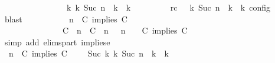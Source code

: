 \begin{isabellebody}
\ \ \ \ \ \ \ \ \ \ \ \ \ \ \ \ {\isasymhookrightarrow}\isactrlbsup k\isactrlesup \ {\isacharparenleft}{\isasymGamma}\isactrlsub k{\isacharcomma}\ Suc\ n\ {\isasymturnstile}\ {\isasymPsi}\isactrlsub k\ {\isasymtriangleright}\ {\isasymPhi}\isactrlsub k{\isacharparenright}{\isacartoucheclose}\isanewline
\ \ \ \ \ \ \ \ \ rc{\isacharcolon}{\isacartoucheopen}{\isasymrho}\ {\isasymin}\ {\isasymlbrakk}\ {\isasymGamma}\isactrlsub k{\isacharcomma}\ Suc\ n\ {\isasymturnstile}\ {\isasymPsi}\isactrlsub k\ {\isasymtriangleright}\ {\isasymPhi}\isactrlsub k\ {\isasymrbrakk}\isactrlsub c\isactrlsub o\isactrlsub n\isactrlsub f\isactrlsub i\isactrlsub g{\isacartoucheclose}\ \isamarkupfalse%
\ blast\isanewline
\ \ \ \ \ \ \ \ \isamarkupfalse%
\ {\isacartoucheopen}{\isacharparenleft}{\isasymGamma}{\isacharcomma}\ n\ {\isasymturnstile}\ {\isacharparenleft}{\isacharparenleft}C\ implies\ C\ {\isacharhash}\ {\isasymPsi}{\isacharparenright}\ {\isasymtriangleright}\ {\isasymPhi}{\isacharparenright}\isanewline
\ \ \ \ \ \ \ \ \ \ \ \ \ \ {\isasymhookrightarrow}\ {\isacharparenleft}{\isacharparenleft}{\isacharparenleft}C\ {\isasymUp}\ n{\isacharparenright}\ {\isacharhash}\ {\isacharparenleft}C\ {\isasymUp}\ n{\isacharparenright}\ {\isacharhash}\ {\isasymGamma}{\isacharparenright}{\isacharcomma}\ n\ {\isasymturnstile}\ {\isasymPsi}\ {\isasymtriangleright}\ {\isacharparenleft}{\isacharparenleft}C\ implies\ C\ {\isacharhash}\ {\isasymPhi}{\isacharparenright}{\isacharparenright}{\isacartoucheclose}\isanewline
\ \ \ \ \ \ \ \ \ \ \isamarkupfalse%
\ {\isacharparenleft}simp\ add{\isacharcolon}\ elims{\isacharunderscore}part\ implies{\isacharunderscore}e{}{\isacharparenright}\isanewline
\ \ \ \ \ \ \ \ \isamarkupfalse%
\ {\isacartoucheopen}{\isacharparenleft}{\isasymGamma}{\isacharcomma}\ n\ {\isasymturnstile}\ {\isacharparenleft}{\isacharparenleft}C\ implies\ C\ {\isacharhash}\ {\isasymPsi}{\isacharparenright}\ {\isasymtriangleright}\ {\isasymPhi}{\isacharparenright}\ {\isasymhookrightarrow}\isactrlbsup Suc\ k\isactrlesup \ {\isacharparenleft}{\isasymGamma}\isactrlsub k{\isacharcomma}\ Suc\ n\ {\isasymturnstile}\ {\isasymPsi}\isactrlsub k\ {\isasymtriangleright}\ {\isasymPhi}\isactrlsub k{\isacharparenright}{\isacartoucheclose}\isanewline

\end{isabellebody}
